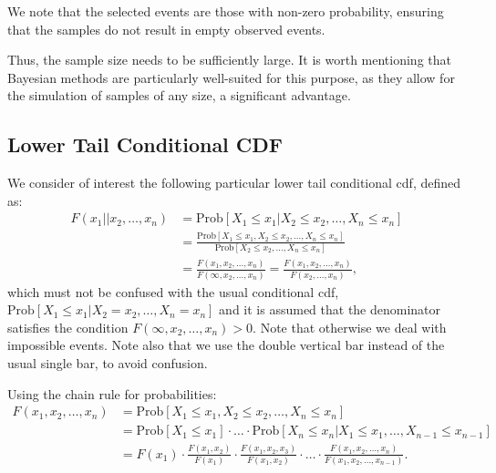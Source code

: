 \documentclass[
	11pt, %
	fleqn, %
	a4paper, %
]{LegrandOrangeBook}
\begin{document}
We note that the selected events are those with non-zero probability, ensuring that the samples do not result in empty observed events.

Thus, the sample size needs to be sufficiently large. It is worth mentioning that Bayesian methods are particularly well-suited for this purpose, as they allow for the simulation of samples of any size, a significant advantage.

\subsection{Lower Tail Conditional CDF}
We consider of interest the following particular lower tail conditional cdf, defined as:
\begin{align}
F(x_1 || x_2,\ldots, x_n) &= \text{Prob}[X_1 \leq x_1|X_2 \leq x_2,\ldots,X_n \leq x_n] \nonumber\\
&= \frac{\text{Prob}[X_1 \leq x_1, X_2 \leq x_2,\ldots, X_n \leq x_n]}{\text{Prob}[X_2 \leq x_2,\ldots, X_n \leq x_n]} \nonumber\\
&= \frac{F(x_1, x_2,\ldots, x_n)}{F(\infty, x_2,\ldots, x_n)} = \frac{F(x_1, x_2,\ldots, x_n)}{F(x_2,\ldots, x_n)},
\label{eq:lowertailconditional}
\end{align}
which must not be confused with the usual conditional cdf, $\text{Prob}[X_1 \leq x_1|X_2 = x_2,\ldots,X_n = x_n]$ and it is assumed that the denominator satisfies the condition $F(\infty, x_2,\ldots, x_n) > 0$. Note that otherwise we deal with impossible events. Note also that we use the double vertical bar instead of the usual single bar, to avoid confusion.

Using the chain rule for probabilities:
\begin{align}
F(x_1, x_2,\ldots, x_n) &= \text{Prob}[X_1 \leq x_1, X_2 \leq x_2,\ldots, X_n \leq x_n] \nonumber\\
&= \text{Prob}[X_1 \leq x_1] \cdot \ldots \cdot \text{Prob}[X_n \leq x_n | X_1 \leq x_1,\ldots, X_{n-1} \leq x_{n-1}] \nonumber\\
&= F(x_1) \cdot \frac{F(x_1, x_2)}{F(x_1)} \cdot \frac{F(x_1, x_2, x_3)}{F(x_1, x_2)} \cdot \ldots \cdot \frac{F(x_1, x_2,\ldots, x_n)}{F(x_1, x_2,\ldots, x_{n-1})}.
\end{align}
\end{document}
